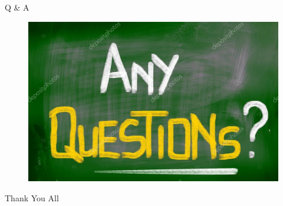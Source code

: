 \documentclass{beamer}
\begin{document}
\begin{frame}{Q \& A}
    \begin{figure}
        \centering
        \includegraphics[width=\textwidth]{any_question.jpg}
        \label{fig:my_label}
    \end{figure}
\end{frame}

\begin{frame}[standout]
    Thank You All
\end{frame}
\end{document}
